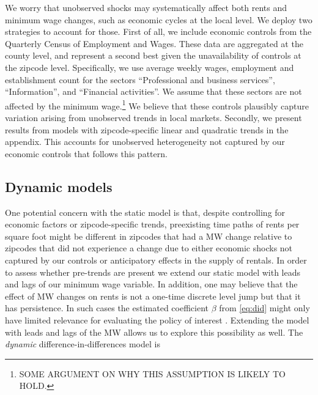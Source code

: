 
We worry that unobserved shocks may systematically affect both rents and minimum wage 
changes, such as economic cycles at the local level. We deploy two strategies to account 
for those. First of all, we include economic controls from the Quarterly Census of 
Employment and Wages. These data are aggregated at the county level, and represent a 
second best given the unavailability of controls at the zipcode level. Specifically, we 
use average weekly wages, employment and establishment count for the sectors 
``Professional and business services'', ``Information'', and ``Financial activities''. 
We assume that these sectors are not affected by the minimum wage.\footnote{SOME ARGUMENT
	ON WHY THIS ASSUMPTION IS LIKELY TO HOLD.}
We believe that these controls plausibly capture variation arising from unobserved trends 
in local markets. Secondly, we present results from models with zipcode-specific linear 
and quadratic trends in the appendix. This accounts for unobserved heterogeneity not 
captured by our economic controls that follows this pattern.

\subsection{Dynamic models}

One potential concern with the static model is that, despite controlling for economic 
factors or zipcode-specific trends, preexisting time paths of rents per square foot might 
be different in zipcodes that had a MW change relative to zipcodes that did not experience 
a change due to either economic shocks not captured by our controls or anticipatory effects 
in the supply of rentals. In order to assess whether pre-trends are present we extend our 
static model with leads and lags of our minimum wage variable. In addition, one may 
believe that the effect of MW changes on rents is not a one-time discrete level jump but 
that it has persistence. In such cases the estimated coefficient $\beta$ from 
\autoref{eq:did} might only have limited relevance for evaluating the policy of interest 
\parencite{callaway2019}. Extending the model with leads and lags of the MW allows us to 
explore this possibility as well. The \textit{dynamic} difference-in-differences model is

